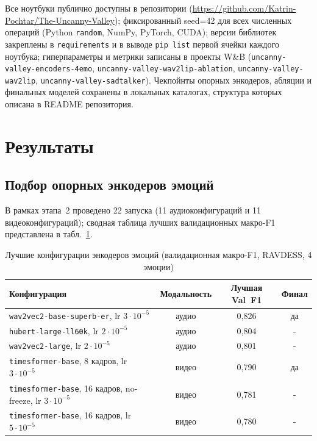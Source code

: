 \documentclass[a4paper, 12pt, oneside, openany]{article}
\begin{document}
Все ноутбуки публично доступны в репозитории (\url{https://github.com/Katrin-Pochtar/The-Uncanny-Valley}); фиксированный seed=42 для всех численных операций (Python \texttt{random}, NumPy, PyTorch, CUDA); версии библиотек закреплены в \texttt{requirements} и в выводе \texttt{pip list} первой ячейки каждого ноутбука; гиперпараметры и метрики записаны в проекты W\&B (\texttt{uncanny-valley-encoders-4emo}, \texttt{uncanny-valley-wav2lip-ablation}, \texttt{uncanny-valley-wav2lip}, \texttt{uncanny-valley-sadtalker}). Чекпойнты опорных энкодеров, абляции и финальных моделей сохранены в локальных каталогах, структура которых описана в README репозитория.

\section{Результаты}

\subsection{Подбор опорных энкодеров эмоций}

В рамках этапа~2 проведено 22 запуска (11 аудиоконфигураций и 11 видеоконфигураций); сводная таблица лучших валидационных макро-F1 представлена в табл.~\ref{tab:enc_sweep}.

\begin{table}[H]
\caption{Лучшие конфигурации энкодеров эмоций (валидационная макро-F1, RAVDESS, 4 эмоции)}
\label{tab:enc_sweep}
\centering
\small
\begin{tabular}{|p{5.5cm}|c|c|c|}
\hline
\textbf{Конфигурация} & \textbf{Модальность} & \textbf{Лучшая Val~F1} & \textbf{Финал} \\
\hline
\texttt{wav2vec2-base-superb-er}, lr $3\!\cdot\!10^{-5}$ & аудио & 0,826 & да \\
\hline
\texttt{hubert-large-ll60k}, lr $2\!\cdot\!10^{-5}$ & аудио & 0,804 & - \\
\hline
\texttt{wav2vec2-large}, lr $2\!\cdot\!10^{-5}$ & аудио & 0,801 & - \\
\hline
\texttt{timesformer-base}, 8 кадров, lr $3\!\cdot\!10^{-5}$ & видео & 0,790 & да \\
\hline
\texttt{timesformer-base}, 16 кадров, no-freeze, lr $3\!\cdot\!10^{-5}$ & видео & 0,781 & - \\
\hline
\texttt{timesformer-base}, 16 кадров, lr $5\!\cdot\!10^{-5}$ & видео & 0,780 & - \\
\hline
\end{tabular}
\end{table}
\end{document}
